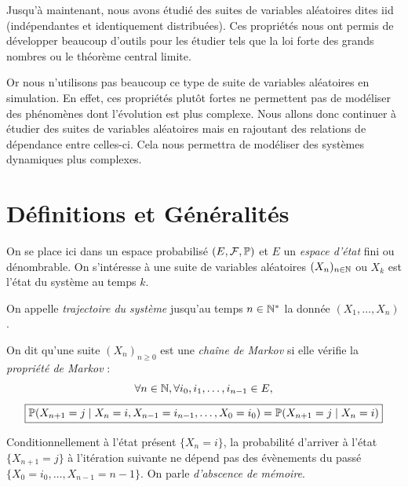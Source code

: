 
\minitoc



Jusqu'à maintenant, nous avons étudié des suites de variables aléatoires dites iid (indépendantes et 
identiquement distribuées). Ces propriétés nous ont permis de développer beaucoup d'outils pour les étudier 
tels que la loi forte des grands nombres ou le théorème central limite. 

Or nous n'utilisons pas beaucoup ce type de suite de variables aléatoires en simulation. En effet, ces propriétés 
plutôt fortes ne permettent pas de modéliser des phénomènes dont l'évolution est plus complexe. Nous allons donc 
continuer à étudier des suites de variables aléatoires mais en rajoutant des relations de dépendance entre celles-ci. 
Cela nous permettra de modéliser des systèmes dynamiques plus complexes. 


\section{Définitions et Généralités}

On se place ici dans un espace probabilisé $(E, \mathcal{F}, \mathbb{P})$  et $E$ un \emph{espace d'état}
fini ou dénombrable. On s'intéresse à une suite de variables aléatoires $(X_n)_{n \in \mathbb{N}}$ ou $X_k$ est 
l'état du système au temps $k$. 

\begin{definition}[Trajectoire]
    On appelle \emph{trajectoire du système} jusqu'au temps $n \in \mathbb{N}^*$ la donnée $(X_1, \dots, X_n)$. 
\end{definition}

\begin{definition}
    On dit qu'une suite $(X_n)_{n \geqslant 0}$ est une \emph{chaîne de Markov} si elle 
    vérifie la \emph{propriété de Markov} : 
        \[ \forall n \in \mathbb{N}, \forall i_0, i_1, \dots, i_{n-1} \in E, \] 
        \[ \boxed{ \mathbb{P} (X_{n+1} = j \; | \; X_n = i, X_{n-1} = i_{n-1}, \dots, X_0 = i_0) = \mathbb{P} (X_{n+1} = j \; | \; X_n = i)} \]
\end{definition}

\begin{remark}
    Conditionnellement à l'état présent $\{X_n = i\}$, la probabilité d'arriver à l'état $\{X_{n+1} = j\}$ 
    à l'itération suivante ne dépend pas des évènements du passé $\{X_0 = i_0, \dots, X_{n-1} = n-1\}$. 
    On parle \emph{d'abscence de mémoire}. 
\end{remark}

